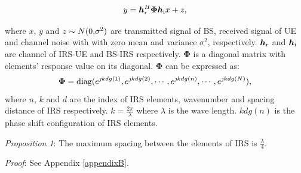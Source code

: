 \documentclass[12pt,draftclsnofoot,onecolumn]{IEEEtran}
\begin{document}
		\begin{equation}\label{received signal}
			y={\bm h}^{H}_{\rm r}{\bm \Phi} {\bm h}_{\rm i}x+z,
		\end{equation}
	
	where $x$, $y$ and $z \sim N{\rm{(}}0{\rm{,}}{\sigma ^2}{\rm{)}}$ are transmitted signal of BS, received signal of UE and channel noise with with zero mean and variance  ${\sigma ^2}$, respectively. ${\bm h}_{\rm r}$ and ${\bm h}_{\rm i}$ are channel of IRS-UE and BS-IRS respectively. $\bm \Phi$ is a diagonal matrix with elements' response value on its diagonal. $\bm \Phi$ can be expressed as:
\begin{equation}\label{Phi}
			{\bm \Phi} = {\rm diag}(e^{\jmath kdg(1)}, e^{\jmath kdg(2)}, \cdots, e^{\jmath kdg(n)},\cdots, e^{\jmath kdg(N)}),
	\end{equation}
	where $n$, $k$ and $d$ are the index of IRS elements, wavenumber and spacing distance of IRS respectively. $k=\frac{2\pi}{\lambda}$ where $\lambda$ is the wave length.  $kdg(n)$ is the phase shift configuration of IRS elements. 
	
	{\itshape Proposition 1}: The maximum spacing between the elements of IRS is $\frac{\lambda}{4}$.
	
	{\itshape Proof}: See Appendix \ref{appendixB}.
	
\end{document}
